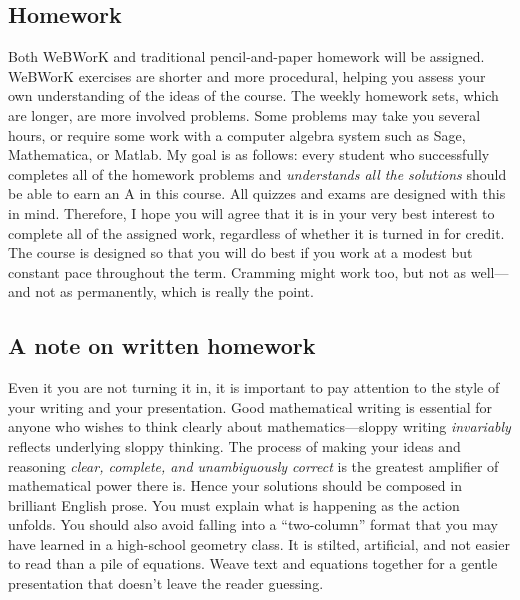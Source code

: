 \documentclass[symmetric]{tufte-handout}
\begin{document}
\subsection{Homework}

Both WeBWorK and traditional pencil-and-paper homework will be assigned.
WeBWorK exercises are shorter and more procedural, helping you assess your
own understanding of the ideas of the course. The weekly homework sets, 
which are longer, are more involved problems. Some problems 
may take you several hours, or require some work with a computer algebra
system such as Sage, Mathematica, or Matlab.%
My goal is as follows: every
student who successfully completes all of the homework problems and
\emph{understands all the solutions} should be able to earn an A in this
course. All quizzes and exams are designed with this in mind. Therefore, I
hope you will agree that it is in your very best interest to complete all of
the assigned work, regardless of whether it is turned in for credit. The
course is designed so that you will do best if you work at a modest but
constant pace throughout the term. Cramming might work too, but not as
well—and not as permanently, which is really the point.

\subsection{A note on written homework}

Even it you are not turning it in, it is important to pay attention to the
style of your writing and your presentation. Good mathematical writing is
essential for anyone who wishes to think clearly about mathematics—sloppy
writing \emph{invariably} reflects underlying sloppy thinking.%
The process of
making your ideas and reasoning \emph{clear, complete, and unambiguously
correct} is the greatest amplifier of mathematical power there is. Hence
your solutions should be composed in brilliant English prose.%
You must explain what is happening as the action unfolds. You should also
avoid falling into a “two-column” format that you may have learned in a 
high-school geometry class. It is stilted, artificial, and not easier to read than
a pile of equations. Weave text and equations together for a gentle
presentation that doesn't leave the reader guessing.
\end{document}
